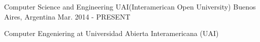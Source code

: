 

\begin{cventries}

  \cventry
    {Computer Science and Engineering} %
    {UAI(Interamerican Open University)} %
    {Buenos Aires, Argentina} %
    {Mar. 2014 - PRESENT} %
    {
      \begin{cvitems}
        Computer Engeniering at Universidad Abierta Interamericana (UAI)
      \end{cvitems}
    }

\end{cventries}



